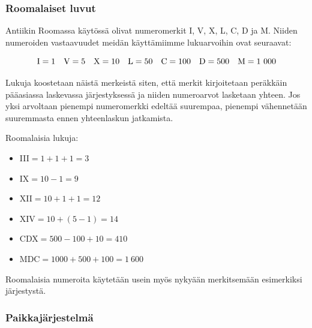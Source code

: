 
\subsubsection*{Roomalaiset luvut}
Antiikin Roomassa käytössä olivat numeromerkit I, V, X, L, C, D ja M. Niiden numeroiden vastaavuudet meidän käyttämiimme lukuarvoihin ovat seuraavat:

\begin{equation*}
\rm I=1\quad
V=5\quad
X=10\quad
L=50\quad
C=100\quad
D=500\quad
M=1~000
\end{equation*}


Lukuja koostetaan näistä merkeistä siten, että merkit kirjoitetaan peräkkäin pääasiassa laskevassa järjestyksessä ja niiden numeroarvot lasketaan yhteen. Jos yksi arvoltaan pienempi numeromerkki edeltää suurempaa, pienempi vähennetään suuremmasta ennen yhteenlaskun jatkamista.

\begin{esimerkki}
Roomalaisia lukuja:
\begin{itemize} %
\item III$=1+1+1=3$
\item IX$=10-1=9$
\item XII$=10+1+1=12$
\item XIV$= 10 + (5 - 1) = 14$
\item CDX$=500-100+10=410$
\item MDC$=1 000+500+100=1~600$
\end{itemize}
\end{esimerkki}

Roomalaisia numeroita käytetään usein myös nykyään merkitsemään esimerkiksi järjestystä.

\subsubsection*{Paikkajärjestelmä}

